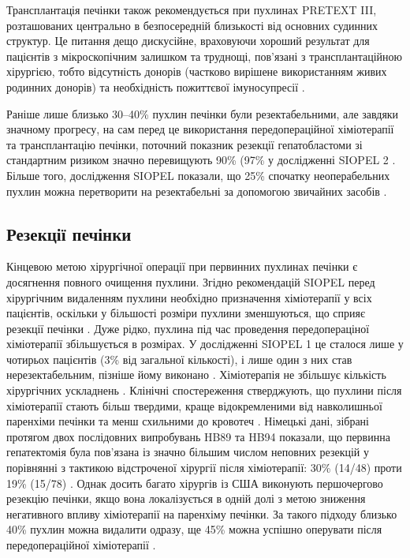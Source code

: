 Трансплантація печінки також рекомендується при пухлинах PRETEXT III, розташованих центрально в безпосередній близькості від основних судинних структур. Це питання дещо дискусійне, враховуючи хороший результат для пацієнтів з мікроскопічним залишком та труднощі, пов’язані з трансплантаційною хірургією, тобто відсутність донорів (частково вирішене використанням живих родинних донорів) та необхідність пожиттєвої імуносупресії \cite{pmid30819543}. 

Раніше лише близько 30–40\% пухлин печінки були резектабельними, але завдяки значному прогресу, на сам перед це використання передопераційної хіміотерапії та трансплантацію печінки, поточний показник резекції гепатобластоми зі стандартним ризиком значно перевищують 90\% (97\% у дослідженні SIOPEL 2 \cite{pmid30946509} \cite{pmid31130716}. Більше того, дослідження SIOPEL показали, що 25\% спочатку неоперабельних пухлин можна перетворити на резектабельні за допомогою звичайних засобів \cite{pmid31155201}. 

\subsection{Резекції печінки}
Кінцевою метою хірургічної операції при первинних пухлинах печінки є досягнення повного очищення пухлини. Згідно рекомендацій SIOPEL перед хірургічним видаленням пухлини необхідно призначення хіміотерапії у всіх пацієнтів, оскільки у більшості розміри пухлини зменшуються, що сприяє резекції печінки \cite{pmid31225421}. Дуже рідко, пухлина під час проведення передопераціної хіміотерапії збільшується в розмірах. У дослідженні SIOPEL 1 це сталося лише у чотирьох пацієнтів (3\% від загальної кількості), і лише один з них став нерезектабельним, пізніше йому виконано \cite{pmid31262438}. Хіміотерапія не збільшує кількість хірургічних ускладнень \cite{pmid31434361}. Клінічні спостереження стверджують, що пухлини після хіміотерапії стають більш твердими, краще відокремленими від навколишньої паренхіми печінки та менш схильними до кровотеч \cite{pmid31584686}. Німецькі дані, зібрані протягом двох послідовних випробувань HB89 та HB94 показали, що первинна гепатектомія була пов'язана із значно більшим числом неповних резекцій у порівнянні з тактикою відстроченої хірургії після хіміотерапії: 30\% (14/48) проти 19\% (15/78) \cite{pmid31645068}. Однак досить багато хірургів із США виконують першочергово резекцію печінки, якщо вона локалізується в одній долі з метою зниження негативного впливу хіміотерапії на паренхіму печінки. За такого підходу близько 40\% пухлин можна видалити одразу, ще 45\% можна успішно оперувати після передопераційної хіміотерапії \cite{pmid31683629}.


